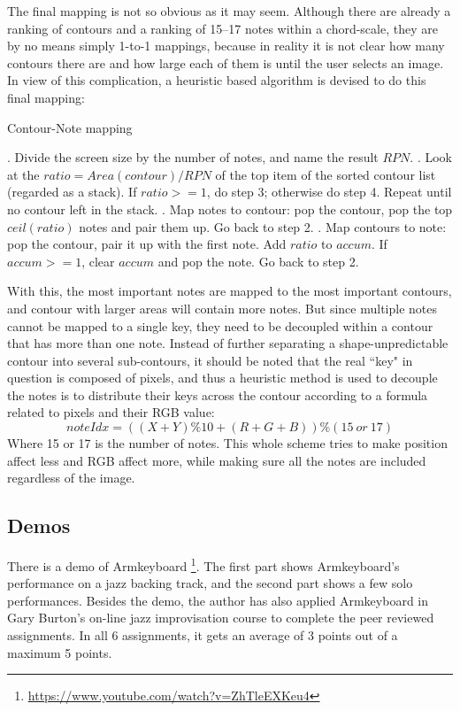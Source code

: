 The final mapping is not so obvious as it may seem. Although there are already a ranking of contours and a ranking of 15--17 notes within a chord-scale, they are by no means simply 1-to-1 mappings, because in reality it is not clear how many contours there are and how large each of them is until the user selects an image. In view of this complication, a heuristic based algorithm is devised to do this final mapping:
\begin{algorithm}
\caption{Contour-Note mapping}
\begin{algorithmic}
. Divide the screen size by the number of notes, and name the result $RPN$.
. Look at the $ ratio = Area(contour) / RPN $ of the top item of the sorted contour list (regarded as a stack). \newline If $ratio>=1$, do step	3; otherwise do step 4. Repeat until no contour left in the stack.
. Map notes to contour: pop the contour, pop the top $ ceil(ratio)$ notes and pair them up. Go back to step 2.
. Map contours to note: pop the contour, pair it up with the first	note. Add $ratio$ to $accum$. If $accum>=1$, clear $accum$ and pop the note. Go back to step 2.
\end{algorithmic}
\end{algorithm}
With this, the most important notes are mapped to the most important contours, and contour with larger areas will contain more notes. But since multiple notes cannot be mapped to a single key, they need to be decoupled  within a contour that has more than one note. Instead of further separating a shape-unpredictable contour into several sub-contours, it should be noted that the real ``key" in question is composed of pixels, and thus a heuristic method is used to decouple the notes is to distribute their keys across the contour according to a formula related to pixels and their RGB value:
\begin{equation}
\mathit{noteIdx = ((X + Y) \% 10 + (R + G + B)) \% (15\ or\ 17)}
\end{equation}
Where 15 or 17 is the number of notes. This whole scheme tries to make position affect less
and RGB affect more, while making sure all the notes are included regardless of the image.

\subsection{Demos}
There is a demo of Armkeyboard \footnote{\url{https://www.youtube.com/watch?v=ZhTleEXKeu4}}. The first part shows Armkeyboard's performance on a jazz backing track, and the second part shows a few solo performances. Besides the demo, the author has also applied Armkeyboard in Gary Burton's on-line jazz improvisation course to complete the peer reviewed assignments. In all 6 assignments, it gets an average of 3 points out of a maximum 5 points.


